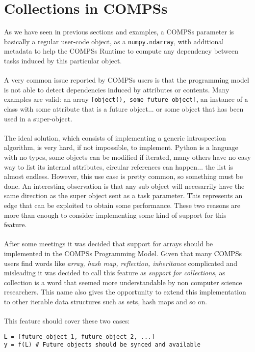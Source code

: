 \section{Collections in COMPSs}
\label{sec:col}
As we have seen in previous sections and examples, a COMPSs parameter is basically a regular user-code object, as a \verb|numpy.ndarray|, with additional metadata to help the COMPSs Runtime to compute any dependency between tasks induced by this particular object.\\
\\
A very common issue reported by COMPSs users is that the programming model is not able to detect dependencies induced by attributes or contents. Many examples are valid: an array \verb|[object(), some_future_object]|, an instance of a class with some attribute that is a future object... or some object that has been used in a super-object.\\
\\
The ideal solution, which consists of implementing a generic introspection algorithm, is very hard, if not impossible, to implement. Python is a language with no types, some objects can be modified if iterated, many others have no easy way to list its internal attributes, circular references can happen... the list is almost endless. However, this use case is pretty common, so something must be done. An interesting observation is that any sub object will necesarrily have the same direction as the super object sent as a task parameter. This represents an edge that can be exploited to obtain some performance. These two reasons are more than enough to consider implementing some kind of support for this feature.\\
\\
After some meetings it was decided that support for arrays should be implemented in the COMPSs Programming Model. Given that many COMPSs users find words like \textit{array, hash map, reflection, inheritance} complicated and misleading it was decided to call this feature as \textit{support for collections}, as collection is a word that seemed more understandable by non computer science researchers. This name also gives the opportunity to extend this implementation to other iterable data structures such as sets, hash maps and so on.\\
\\
This feature should cover these two cases:
\begin{verbatim}
L = [future_object_1, future_object_2, ...]
y = f(L) # Future objects should be synced and available
\end{verbatim}

